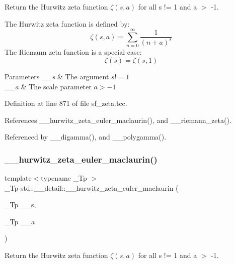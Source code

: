 Return the Hurwitz zeta function $ \zeta(s,a) $ for all s != 1 and a $>$ -\/1. 

The Hurwitz zeta function is defined by\+: \[ \zeta(s,a) = \sum_{n=0}^{\infty} \frac{1}{(n+a)^s} \] The Riemann zeta function is a special case\+: \[ \zeta(s) = \zeta(s,1) \]


\begin{DoxyParams}{Parameters}
{\em \+\_\+\+\_\+s} & The argument $ s != 1 $ \\
\hline
{\em \+\_\+\+\_\+a} & The scale parameter $ a > -1 $ \\
\hline
\end{DoxyParams}


Definition at line 871 of file sf\+\_\+zeta.\+tcc.



References \+\_\+\+\_\+hurwitz\+\_\+zeta\+\_\+euler\+\_\+maclaurin(), and \+\_\+\+\_\+riemann\+\_\+zeta().



Referenced by \+\_\+\+\_\+digamma(), and \+\_\+\+\_\+polygamma().

\mbox{\label{namespacestd_1_1____detail_a56c55858723fe9e0c541f0e77572b58d}} 
\subsubsection{\texorpdfstring{\+\_\+\+\_\+hurwitz\+\_\+zeta\+\_\+euler\+\_\+maclaurin()}{\_\_hurwitz\_zeta\_euler\_maclaurin()}}
{\footnotesize\ttfamily template$<$typename \+\_\+\+Tp $>$ \\
\+\_\+\+Tp std\+::\+\_\+\+\_\+detail\+::\+\_\+\+\_\+hurwitz\+\_\+zeta\+\_\+euler\+\_\+maclaurin (\begin{DoxyParamCaption}\item[{\+\_\+\+Tp}]{\+\_\+\+\_\+s,  }\item[{\+\_\+\+Tp}]{\+\_\+\+\_\+a }\end{DoxyParamCaption})}



Return the Hurwitz zeta function $ \zeta(s,a) $ for all s != 1 and a $>$ -\/1. 

